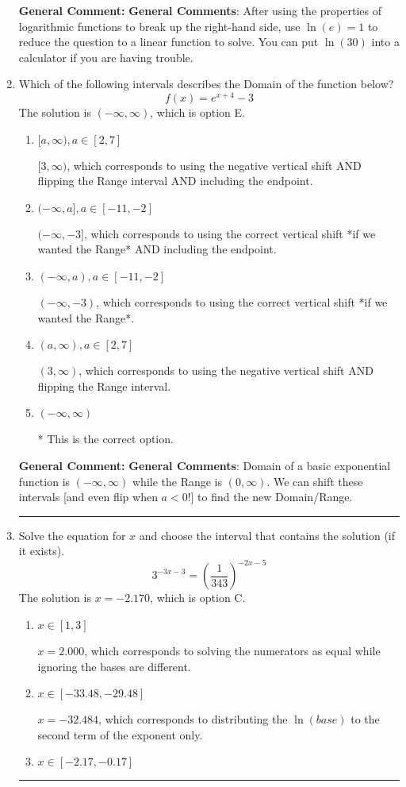 \documentclass{extbook}[14pt]
\newcommand{\litem}[1]{\item #1

\rule{\textwidth}{0.4pt}}
\begin{document}
\begin{enumerate}
{\textbf{General Comment:} \textbf{General Comments}: After using the properties of logarithmic functions to break up the right-hand side, use $\ln(e) = 1$ to reduce the question to a linear function to solve. You can put $\ln(30)$ into a calculator if you are having trouble.
}
\litem{
Which of the following intervals describes the Domain of the function below?
\[ f(x) = e^{x+4}-3 \]The solution is \( (-\infty, \infty) \), which is option E.\begin{enumerate}[label=\Alph*.]
\item \( [a, \infty), a \in [2, 7] \)

$[3, \infty)$, which corresponds to using the negative vertical shift AND flipping the Range interval AND including the endpoint.
\item \( (-\infty, a], a \in [-11, -2] \)

$(-\infty, -3]$, which corresponds to using the correct vertical shift *if we wanted the Range* AND including the endpoint.
\item \( (-\infty, a), a \in [-11, -2] \)

$(-\infty, -3)$, which corresponds to using the correct vertical shift *if we wanted the Range*.
\item \( (a, \infty), a \in [2, 7] \)

$(3, \infty)$, which corresponds to using the negative vertical shift AND flipping the Range interval.
\item \( (-\infty, \infty) \)

* This is the correct option.
\end{enumerate}

\textbf{General Comment:} \textbf{General Comments}: Domain of a basic exponential function is $(-\infty, \infty)$ while the Range is $(0, \infty)$. We can shift these intervals [and even flip when $a<0$!] to find the new Domain/Range.
}
\litem{
Solve the equation for $x$ and choose the interval that contains the solution (if it exists).
\[ 3^{-3x-3} = \left(\frac{1}{343}\right)^{-2x-5} \]The solution is \( x = -2.170 \), which is option C.\begin{enumerate}[label=\Alph*.]
\item \( x \in [1, 3] \)

$x = 2.000$, which corresponds to solving the numerators as equal while ignoring the bases are different.
\item \( x \in [-33.48, -29.48] \)

$x = -32.484$, which corresponds to distributing the $\ln(base)$ to the second term of the exponent only.
\item \( x \in [-2.17, -0.17] \)


\end{enumerate}}
\end{enumerate}
\end{document}
